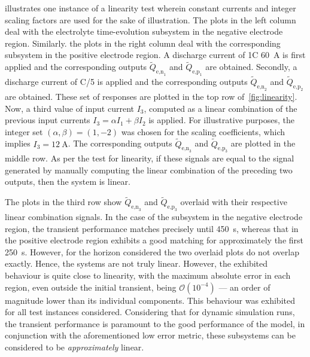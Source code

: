   illustrates  one  instance  of a  linearity  test  wherein
constant  currents  and  integer  scaling  factors are  used  for  the  sake  of
illustration.  The  plots   in  the  left  column  deal   with  the  electrolyte
time-evolution  subsystem  in  the  negative electrode  region.  Similarly.  the
plots  in  the  right  column  deal with  the  corresponding  subsystem  in  the
positive electrode region.  A discharge current of 1C  \ie{} \SI{60}{\ampere} is
first  applied  and  the  corresponding  outputs  $\widetilde{Q}_{\text{e,n}_1}$
and   $\widetilde{Q}_{\text{e,p}_1}$  are   obtained.   Secondly,  a   discharge
current   of   C/5   \ie{}   is    applied   and   the   corresponding   outputs
$\widetilde{Q}_{\text{e,n}_2}$ and  $\widetilde{Q}_{\text{e,p}_2}$ are obtained.
These set of responses are plotted  in the top row of~\cref{fig:linearity}. Now,
a  third  value  of  input  current $I_3$,  computed  as  a  linear  combination
of  the  previous  input  currents  \ie{}  $I_3 =  \alpha  I_1  +  \beta  I_2  $
is  applied.  For  illustrative  purposes, the  integer  set  $(\alpha,\beta)  =
(1,-2)$  was  chosen  for  the   scaling  coefficients,  which  implies  $I_3  =
\SI{12}{\ampere}$. The corresponding  outputs $\widetilde{Q}_{\text{e,n}_3}$ and
$\widetilde{Q}_{\text{e,p}_3}$ are  plotted in the  middle row. As per  the test
for linearity,  if these signals are  equal to the signal  generated by manually
computing the linear  combination of the preceding two outputs,  then the system
is linear.

The   plots   in  the   third   row   show  $\widetilde{Q}_{\text{e,n}_3}$   and
$\widetilde{Q}_{\text{e,p}_3}$ overlaid with their respective linear combination
signals. In  the case  of the  subsystem in the  negative electrode  region, the
transient performance matches  precisely until \approx\SI{450}{\second}, whereas
that in the positive electrode region exhibits a good matching for approximately
the  first  \SI{250}{\second}.  However,  for the  horizon  considered  the  two
overlaid plots do not overlap exactly.  Hence, the systems are not truly linear.
However, the exhibited  behaviour is quite close to linearity,  with the maximum
absolute  error  in each  region,  even  outside  the initial  transient,  being
$\mathcal{O}(10^{-4})$  --- an  order  of magnitude  lower  than its  individual
components.  This behaviour  was exhibited  for all  test instances  considered.
Considering  that for  dynamic  simulation runs,  the  transient performance  is
paramount  to  the good  performance  of  the  model,  in conjunction  with  the
aforementioned  low error  metric,  these  subsystems can  be  considered to  be
\emph{approximately} linear.


